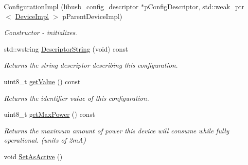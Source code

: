 \begin{DoxyCompactItemize}
\item 
\hypertarget{class_lib_u_s_b_1_1_configuration_impl_a0b11de0d60d51f2f6c1d38124b34b04f}{\hyperlink{class_lib_u_s_b_1_1_configuration_impl_a0b11de0d60d51f2f6c1d38124b34b04f}{Configuration\-Impl} (libusb\-\_\-config\-\_\-descriptor $\ast$p\-Config\-Descriptor, std\-::weak\-\_\-ptr$<$ \hyperlink{class_lib_u_s_b_1_1_device_impl}{Device\-Impl} $>$ p\-Parent\-Device\-Impl)}\label{class_lib_u_s_b_1_1_configuration_impl_a0b11de0d60d51f2f6c1d38124b34b04f}

\begin{DoxyCompactList}\small\item\em Constructor -\/ initializes. \end{DoxyCompactList}\item 
\hypertarget{class_lib_u_s_b_1_1_configuration_impl_a67a1ec3e03c58c8ccc5a2dbb48449e57}{std\-::wstring \hyperlink{class_lib_u_s_b_1_1_configuration_impl_a67a1ec3e03c58c8ccc5a2dbb48449e57}{Descriptor\-String} (void) const }\label{class_lib_u_s_b_1_1_configuration_impl_a67a1ec3e03c58c8ccc5a2dbb48449e57}

\begin{DoxyCompactList}\small\item\em Returns the string descriptor describing this configuration. \end{DoxyCompactList}\item 
\hypertarget{class_lib_u_s_b_1_1_configuration_impl_a52098d1d98462e66d75c9d9ef3dd7554}{uint8\-\_\-t \hyperlink{class_lib_u_s_b_1_1_configuration_impl_a52098d1d98462e66d75c9d9ef3dd7554}{get\-Value} () const }\label{class_lib_u_s_b_1_1_configuration_impl_a52098d1d98462e66d75c9d9ef3dd7554}

\begin{DoxyCompactList}\small\item\em Returns the identifier value of this configuration. \end{DoxyCompactList}\item 
\hypertarget{class_lib_u_s_b_1_1_configuration_impl_ad51bb092ef0b3bad913512e874423037}{uint8\-\_\-t \hyperlink{class_lib_u_s_b_1_1_configuration_impl_ad51bb092ef0b3bad913512e874423037}{get\-Max\-Power} () const }\label{class_lib_u_s_b_1_1_configuration_impl_ad51bb092ef0b3bad913512e874423037}

\begin{DoxyCompactList}\small\item\em Returns the maximum amount of power this device will consume while fully operational. (units of 2m\-A) \end{DoxyCompactList}\item 
\hypertarget{class_lib_u_s_b_1_1_configuration_impl_ac71f8ee195c25152e2cf376f012371f3}{void \hyperlink{class_lib_u_s_b_1_1_configuration_impl_ac71f8ee195c25152e2cf376f012371f3}{Set\-As\-Active} ()}\label{class_lib_u_s_b_1_1_configuration_impl_ac71f8ee195c25152e2cf376f012371f3}


\end{DoxyCompactItemize}
